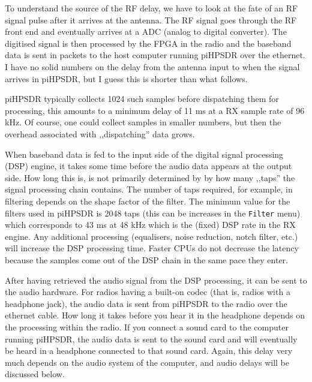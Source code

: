 \documentclass[12pt]{book}
\def\bltt#1{\texttt{\color{blue}#1}}
\def\pH{pi\-HPSDR\xspace}
\begin{document}
To understand the source of the RF delay, we have to look at the fate of an RF signal pulse after
it arrives at the antenna. The RF signal goes through the RF front end and eventually arrives
at a ADC (analog to digital converter). The digitised signal is then processed by the FPGA in the
radio and the baseband data is sent in packets to the host computer running \pH over the ethernet.
I have no solid numbers on the delay from the antenna input to when the signal arrives in \pH,
but I guess this is shorter than what follows.

\pH typically collects 1024 such samples before dispatching them for processing, this amounts
to a minimum delay of 11 ms at a RX sample rate of 96 kHz. Of course, one could collect
samples in smaller numbers, but then the overhead associated with ,,dispatching'' data grows.

When baseband data is fed to the input side of the
digital signal processing (DSP) engine, it takes some time before the
audio data appears at the output side. How long this is, is not primarily determined by
by how many ,,taps'' the signal processing chain contains. The number
of taps required, for example, in filtering depends on the shape factor of the filter.
The minimum value for the filters used in \pH is 2048 taps (this can be increases in the \bltt{Filter}
menu) which corresponds to 43 ms at 48 kHz which is the (fixed) DSP rate in the RX engine. Any
additional processing (equalisers, noise reduction, notch filter, etc.) will increase
the DSP processing time. Faster CPUs do not decrease the latency because the samples come out
of the DSP chain in the same pace they enter.

After having retrieved the audio signal from the DSP processing, it can be sent to the audio hardware.
For radios having a built-on codec (that is, radios with a headphone jack), the audio data is sent
from \pH to the radio over the ethernet cable. How long it takes before you hear it in the headphone
depends on the processing within the radio. If you connect a sound card to the computer running \pH,
the audio data is sent to the sound card  and will eventually be heard in a headphone connected
to that sound card. Again, this delay very much depends on the audio system of the computer, and
audio delays will be discussed below.
\end{document}
